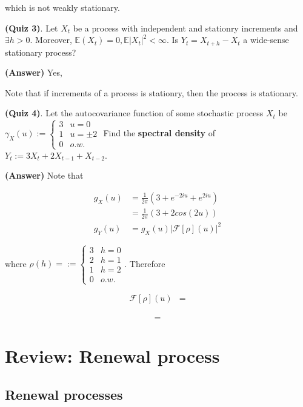 \documentclass[12pt]{article}
\theoremstyle{nonumberbreak}
\begin{document}
which is not weakly stationary. 


\textbf{(Quiz 3)}. Let $X_t$ be a process with independent and stationry increments and $\exists h>0$. Moreover, $\mathbb{E}(X_t) = 0, \mathbb{E}|X_t|^2 < \infty$. Is $Y_t = X_{t+h} - X_t$ a wide-sense stationary process? 

\textbf{(Answer)} Yes,

Note that if increments of a process is stationry, then the process is stationary.



\textbf{(Quiz 4)}. Let the autocovariance function of some stochastic process $X_t$ be $\gamma_X(u) := \begin{cases} 3 & u=0 \\ 1 & u=\pm2 \\ 0 & o.w. \end{cases}$ Find the \textbf{spectral density} of $Y_t := 3X_t + 2X_{t-1} + X_{t-2}$. 

\textbf{(Answer)} Note that 

$$
\begin{aligned}
g_X(u) &= \frac{1}{2\pi} ( 3 + e^{-2iu} + e^{2iu}) \\[8pt]
&= \frac{1}{2\pi} (3 + 2 cos(2u)) \\[10pt]
g_Y(u) &= g_X(u) |\mathcal{F}[\rho] (u)|^2
\end{aligned}
$$

where $\rho(h) = := \begin{cases} 3 & h=0 \\ 2 & h=1 \\ 1 & h=2 \\ 0 & o.w. \end{cases}$. Therefore

$$
\begin{aligned}
\mathcal{F}[\rho] (u) &= \\[8pt]
\end{aligned}
$$

$$
 =
$$



\section*{Review: Renewal process}

\subsection*{Renewal processes}
\end{document}
